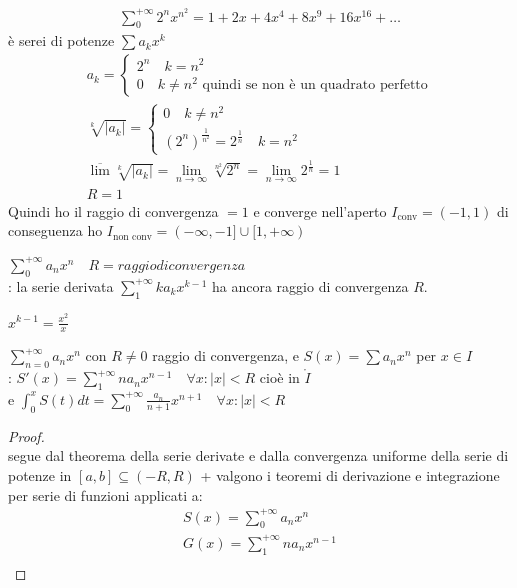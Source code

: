 \documentclass[a4paper, oneside]{article}
\begin{document}
\begin{example}
  \begin{gather*}
    \sum_{0}^{+\infty} 2^n x^{n^2} = 1 + 2x + 4x^4 + 8x^9 + 16x^{16} + \dots
  \end{gather*}
  è serei di potenze $\sum a_k x^k$
  \begin{gather*}
    a_k = \begin{cases}
      2^n \quad k = n^2\\
      0 \quad k \neq n^2 \text{ quindi se non è un quadrato perfetto}
    \end{cases} \\
    \sqrt[k]{|a_k|} = \begin{cases}
      0 \quad k \neq n^2\\
      (2^n)^{\frac{1}{n^2}} = 2^{\frac{1}{n}} \quad k = n^2
    \end{cases} \\
    \overline{\lim} \sqrt[k]{|a_k|} = \lim_{n \to \infty} \sqrt[n^2]{2^n} = \lim_{n \to \infty} 2^{\frac{1}{n}} = 1 \\
    R = 1
  \end{gather*}
  Quindi ho il raggio di convergenza $= 1$ e converge nell'aperto $I_\text{conv} = (-1,1)$ di conseguenza ho $I_\text{non conv} = (-\infty, -1] \cup [1, +\infty)$
\end{example}


\begin{theorem}
    $\sum_{0}^{+\infty} a_n x^n \quad R = raggio di convergenza$ \\
    : la serie derivata $\sum_{1}^{+\infty} k a_k x^{k-1}$ ha ancora raggio di convergenza $R$.
\end{theorem}
\begin{observation}
  $x^{k-1} = \frac{x^2}{x}$
\end{observation}

\begin{theorem}
  $\sum_{n=0}^{+\infty} a_n x^n$ con $R \neq 0$ raggio di convergenza, e $S(x) = \sum a_n x^n$ per $x \in I$\\
  : $S'(x) = \sum_{1}^{+\infty} n a_n x^{n-1} \quad \forall x:|x| < R$ cioè in $\mathring{I}$\\
  e $\int_0^x S(t) dt = \sum_{0}^{+\infty} \frac{a_n}{n+1} x^{n+1} \quad \forall x: |x| < R$
\end{theorem}
\begin{proof}
  \hfil\\
  segue dal theorema della serie derivate e dalla convergenza uniforme della serie di potenze in $[a,b] \subseteq (-R,R)$ + valgono i teoremi di derivazione e integrazione per serie di funzioni applicati a:
  \begin{gather*}
    S(x) = \sum_{0}^{+\infty} a_n x^n \\
    G(x) = \sum_{1}^{+\infty} n a_n x^{n-1} \\
  \end{gather*}
\end{proof}
\end{document}
